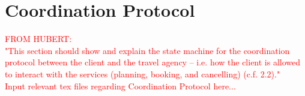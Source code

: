 \chapter{Coordination Protocol}
\textcolor{red}{FROM HUBERT:\\
"This section should show and explain the state machine for the coordination protocol between the client and the travel agency – i.e. how the client is allowed to interact with the services (planning, booking, and cancelling) (c.f. 2.2)."\\
Input relevant tex files regarding Coordination Protocol here...}
